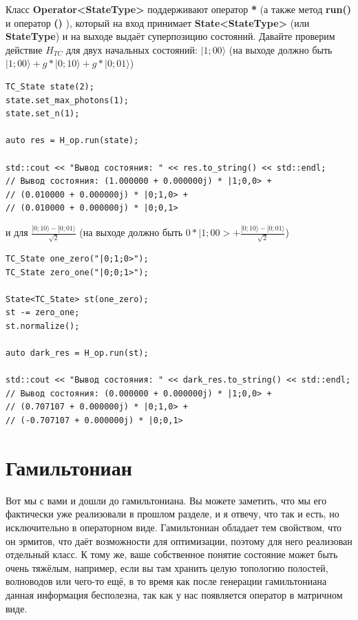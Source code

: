 \documentclass[12pt,fleqn]{article}
\begin{document}
        Класс \textbf{Operator<StateType>} поддерживают оператор \textbf{*} (а также метод \textbf{run()} и оператор \textbf{()} ),
        который на вход принимает \textbf{State<StateType>} (или \textbf{StateType}) и
        на выходе выдаёт суперпозицию состояний. Давайте проверим действие 
        $H_{TC}$ для двух начальных состояний: $|1;00\rangle$ (на выходе должно быть $|1;00\rangle + g*|0;10\rangle + g*|0;01\rangle$)

\begin{mdframed}[linecolor=black, topline=true, bottomline=true,
leftline=false, rightline=false]
\begin{verbatim}
TC_State state(2);
state.set_max_photons(1);
state.set_n(1);

auto res = H_op.run(state);

std::cout << "Вывод состояния: " << res.to_string() << std::endl;
// Вывод состояния: (1.000000 + 0.000000j) * |1;0,0> + 
// (0.010000 + 0.000000j) * |0;1,0> + 
// (0.010000 + 0.000000j) * |0;0,1>
\end{verbatim}
\end{mdframed}

        и для $\frac{|0;10\rangle - |0;01\rangle}{\sqrt{2}}$ (на выходе должно быть $0*|1;00> + \frac{|0;10\rangle - |0;01\rangle}{\sqrt{2}}$)

\begin{mdframed}[linecolor=black, topline=true, bottomline=true,
leftline=false, rightline=false]
\begin{verbatim}
TC_State one_zero("|0;1;0>");
TC_State zero_one("|0;0;1>");

State<TC_State> st(one_zero);
st -= zero_one;
st.normalize();

auto dark_res = H_op.run(st);

std::cout << "Вывод состояния: " << dark_res.to_string() << std::endl;
// Вывод состояния: (0.000000 + 0.000000j) * |1;0,0> + 
// (0.707107 + 0.000000j) * |0;1,0> + 
// (-0.707107 + 0.000000j) * |0;0,1>
\end{verbatim}
\end{mdframed}


        \section{Гамильтониан}

        Вот мы с вами и дошли до гамильтониана. Вы можете заметить, что мы его фактически уже реализовали в прошлом разделе, и я отвечу, что так и есть, но исключительно в операторном виде. 
        Гамильтониан обладает тем свойством, что он эрмитов, что даёт возможности для оптимизации, поэтому для него реализован отдельный класс. К тому же, ваше собственное понятие состояние 
        может быть очень тяжёлым, например, если вы там хранить целую топологию полостей, волноводов или чего-то ещё, в то время как после генерации гамильтониана данная информация бесполезна, так как 
        у нас появляется оператор в матричном виде.
\end{document}
